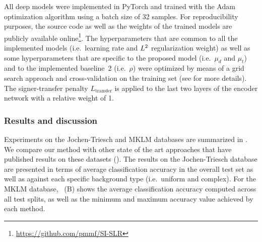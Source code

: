 All deep models were implemented in PyTorch and trained with the Adam optimization algorithm using a batch size of 32 samples. For reproducibility purposes, the source code as well as the weights of the trained models are publicly available online\footnote{\url{https://github.com/pmmf/SI-SLR}}. The hyperparameters that are common to all the implemented models (i.e.\ learning rate and $L^2$ regularization weight) as well as some hyperparameters that are specific to the proposed model (i.e.\ $\mu_d$ and $\mu_t$) and to the implemented baseline~2 (i.e.\ $\rho$) were optimized by means of a grid search approach and cross-validation on the training set (see  for more details). The signer-transfer penalty $L_{\text{transfer}}$ is applied to the last two layers of the encoder network with a relative weight of 1.

\begin{table}[t]
    \centering
    \caption{Hyperparameter sets.}
    \label{tab:hyperparam}
\end{table}

\subsubsection{Results and discussion}
Experiments on the Jochen-Triesch and MKLM databases are summarized in . We compare our method with other state of the art approaches that have published results on these datasets (\citet{Dahmani2014, Just2006, Kelly2010, Marin2014, Ferreira2018}). The results on the Jochen-Triesch database are presented in terms of average classification accuracy in the overall test set as well as against each specific background type (i.e.\ uniform and complex). For the MKLM database, ~(B) shows the average classification accuracy computed across all test splits, as well as the minimum and maximum accuracy value achieved by each method.

